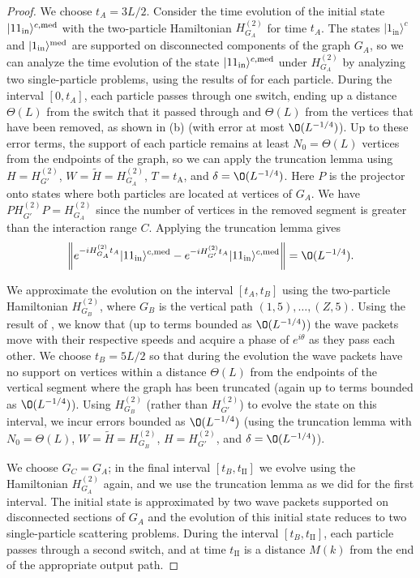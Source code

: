 \documentclass[../thesis-main/thesis-main]{subfiles}
\begin{document}
\begin{proof}
 We choose $t_{A}={3L}/{2}$. Consider the time evolution of the initial state $|11_\text{in}\rangle^{c,\text{med}}$ with the two-particle Hamiltonian $H_{G_A}^{(2)}$ for time $t_A$. The states $|1_ {\text{in}}\rangle^c$ and $|1_\text{in}\rangle^{\text{med}}$ are supported on disconnected components of the graph $G_A$, so we can analyze the time evolution of the state $|11_\text{in}\rangle^{c,\text{med}}$ under $H_{G_A}^{(2)}$ by analyzing two single-particle problems, using the results of  for each particle. During the interval $[0,t_A]$,  each particle passes through one switch, ending up a distance $\Theta(L)$ from the switch that it passed through and $\Theta(L)$ from the vertices that have been removed, as shown in (b) (with error at most $\O(L^{-{1}/{4}})$). Up to these error terms, the support of each particle remains at least $N_0=\Theta(L)$ vertices from the endpoints of the graph, so we can apply the truncation lemma using $H=H_{G'}^{(2)}$, $W=\tilde{H}=H_{G_A}^{(2)}$, $T=t_{\mathrm{A}}$, and $\delta=\O(L^{-{1}/{4}})$. Here $P$ is the projector onto states where both particles are located at vertices of $G_A$. We have $P H_{G'}^{(2)}P=H_{G_A}^{(2)}$ since the number of vertices in the removed segment is greater than the interaction range $C$. Applying the truncation lemma gives
\begin{align}
\left\Vert e^{-iH_{G_A}^{(2)}t_A}|11_\text{in}\rangle^{c,\med}-e^{-iH_{G'}^{(2)}t_A}|11_\text{in}\rangle^{c,\med}\right\Vert=\O(L^{-{1}/{4}}).
\end{align}

We approximate the evolution on the interval $[t_A,t_B]$ using the two-particle  Hamiltonian $H_{G_B}^{(2)}$, where $G_B$  is the vertical path $(1,5),\ldots,(Z,5)$. Using the result of , we know that (up to terms bounded as $\O(L^{-{1}/{4}})$) the wave packets move with their respective speeds and acquire a phase of $e^{i\theta}$ as they pass each other. We choose $t_B={5L}/{2}$ so that during the evolution the wave packets have no support on vertices within a distance $\Theta(L)$ from the endpoints of the vertical segment where the graph has been truncated (again up to terms bounded as $\O(L^{-{1}/{4}})$). Using $H_{G_B}^{(2)}$ (rather than $H_{G'}^{(2)}$) to evolve the state on this interval, we incur errors bounded as $\O(L^{-{1}/{4}})$ (using the truncation lemma with $N_0=\Theta(L)$, $W=\tilde{H}=H_{G_B}^{(2)}$, $H=H_{G'}^{(2)}$, and $\delta=\O(L^{-{1}/{4}})$).

We choose $G_C=G_A$; in the final interval $[t_{B},t_{\mathrm{II}}]$ we evolve using the Hamiltonian  $H_{G_A}^{(2)}$ again, and we use the truncation lemma as we did for the first interval. The initial state is approximated by two wave packets supported on disconnected sections of $G_A$ and the evolution of this initial state reduces to two single-particle scattering problems. During the interval $[t_B,t_{\mathrm{II}}]$, each particle passes through a second switch, and at time $t_{\mathrm{II}}$ is a distance $M(k)$ from the end of the appropriate output path. 


\end{proof}
\end{document}
